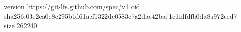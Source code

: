 version https://git-lfs.github.com/spec/v1
oid sha256:03e2ea0e8c295b1d61acf1322de0583c7a2dae42ba71c1fdfdfb0da8a972eed7
size 262240
